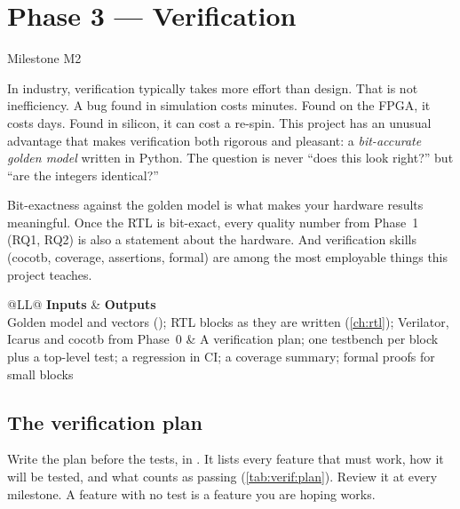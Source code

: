 \chapter{Phase 3 --- Verification}\label{ch:verification}

 \quad Milestone M2

In industry, verification typically takes more effort than design. That is not
inefficiency. A bug found in simulation costs minutes. Found on the FPGA, it
costs days. Found in silicon, it can cost a re-spin. This project has an
unusual advantage that makes verification both rigorous and pleasant: a
\emph{bit-accurate golden model} written in Python. The question is never
\enquote{does this look right?} but \enquote{are the integers identical?}

\begin{whybox}
Bit-exactness against the golden model is what makes your hardware results
meaningful. Once the RTL is bit-exact, every quality number from Phase~1 (RQ1,
RQ2) is also a statement about the hardware. And verification skills (cocotb,
coverage, assertions, formal) are among the most employable things this project
teaches.
\end{whybox}

\begin{center}\small
\begin{tabularx}{\textwidth}{@{}LL@{}}
\toprule
\textbf{Inputs} & \textbf{Outputs} \\
\midrule
Golden model and vectors (); RTL blocks as they are written
(\cref{ch:rtl}); Verilator, Icarus and cocotb from Phase~0
& A verification plan; one testbench per block plus a top-level test; a
regression in CI; a coverage summary; formal proofs for small blocks \\
\bottomrule
\end{tabularx}
\end{center}

\section{The verification plan}\label{sec:verif:plan}

Write the plan before the tests, in . It lists
every feature that must work, how it will be tested, and what counts as passing
(\cref{tab:verif:plan}). Review it at every milestone. A feature with no test is
a feature you are hoping works.

